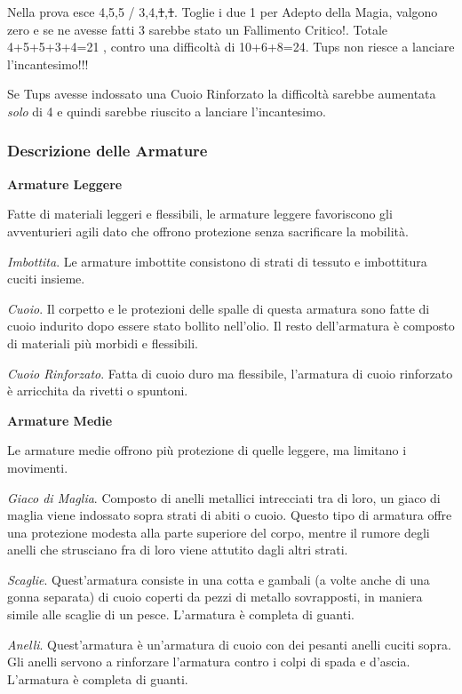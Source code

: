 \begin{multicols}{2}
Nella prova esce 4,5,5 / 3,4,\st{1},\st{1}. Toglie i due 1 per Adepto della Magia, valgono zero e se ne avesse fatti 3 sarebbe stato un Fallimento Critico!. Totale 4+5+5+3+4=21 , contro una difficoltà di 10+6+8=24. Tups non riesce a lanciare l'incantesimo!!!

Se Tups avesse indossato una Cuoio Rinforzato la difficoltà sarebbe aumentata \emph{solo} di 4 e quindi sarebbe riuscito a lanciare l'incantesimo.

\subsubsection{Descrizione delle Armature}

\textbf{Armature Leggere}

Fatte di materiali leggeri e flessibili, le armature leggere favoriscono gli avventurieri agili dato che offrono protezione senza sacrificare la mobilità.

\emph{Imbottita}. Le armature imbottite consistono di strati di tessuto e imbottitura cuciti insieme.

\emph{Cuoio}. Il corpetto e le protezioni delle spalle di questa armatura sono fatte di cuoio indurito dopo essere stato bollito nell'olio. Il resto dell'armatura è composto di
materiali più morbidi e flessibili.

\emph{Cuoio Rinforzato}. Fatta di cuoio duro ma flessibile, l'armatura di cuoio rinforzato è arricchita da rivetti o spuntoni.

\textbf{Armature Medie}

Le armature medie offrono più protezione di quelle leggere, ma limitano i movimenti.

\emph{Giaco di Maglia}. Composto di anelli metallici intrecciati tra di loro, un giaco di maglia viene indossato sopra strati di abiti o cuoio. Questo tipo di armatura offre una protezione modesta alla parte superiore del corpo, mentre il rumore degli anelli che strusciano fra di loro viene attutito dagli altri strati.

\emph{Scaglie}. Quest'armatura consiste in una cotta e gambali (a volte anche di una gonna separata) di cuoio coperti da pezzi di metallo sovrapposti, in maniera simile alle scaglie di un pesce. L'armatura è completa di guanti.

\emph{Anelli}. Quest'armatura è un'armatura di cuoio con dei pesanti anelli cuciti sopra. Gli anelli servono a rinforzare l'armatura contro i colpi di spada e d'ascia. L'armatura è completa di guanti.


\end{multicols}
